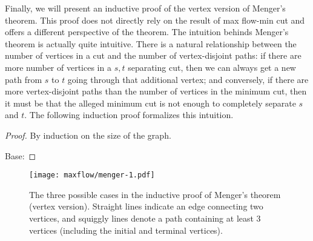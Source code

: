 Finally, we will present an inductive proof of the vertex version of Menger's theorem. This proof does not directly rely on the result of max flow-min cut and offers a different perspective of the theorem. The intuition behinds Menger's theorem is actually quite intuitive. There is a natural relationship between the number of vertices in a cut and the number of vertex-disjoint paths: if there are more number of vertices in a $s,t$ separating cut, then we can always get a new path from $s$ to $t$ going through that additional vertex; and conversely, if there are more vertex-disjoint paths than the number of vertices in the minimum cut, then it must be that the alleged minimum cut is not enough to completely separate $s$ and $t$. The following induction proof formalizes this intuition.

\begin{proof}
    By induction on the size of the graph.

    Base: 
\end{proof}

\begin{figure}[htbp]
    \centering
    \texttt{[image: maxflow/menger-1.pdf]}
    \caption{The three possible cases in the inductive proof of Menger's theorem (vertex version). Straight lines indicate an edge connecting two vertices, and squiggly lines denote a path containing at least 3 vertices (including the initial and terminal vertices).}
    \label{fig:menger-undirected-1}
\end{figure}